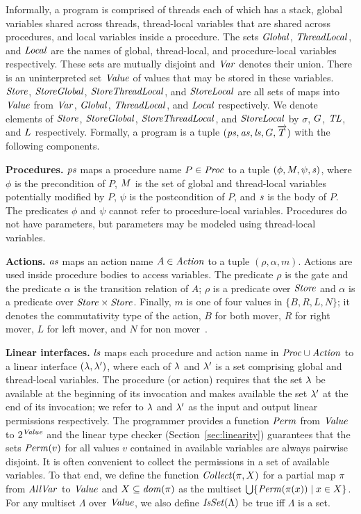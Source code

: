 Informally, a \civl program is comprised of threads each of which has a stack, global variables shared across threads, 
thread-local variables that are shared across procedures, and local variables inside a procedure.
The sets $\mathit{Global}$, $\mathit{ThreadLocal}$, and $\mathit{Local}$ are the names of global, thread-local, and procedure-local variables 
respectively.
These sets are mutually disjoint and $\mathit{Var}$ denotes their union.
There is an uninterpreted set $\mathit{Value}$ of values that may be stored in these variables.
$\mathit{Store}$, $\mathit{StoreGlobal}$, $\mathit{StoreThreadLocal}$, and $\mathit{StoreLocal}$ are all sets of maps into $\mathit{Value}$
from $\mathit{Var}$, $\mathit{Global}$, $\mathit{ThreadLocal}$, and $\mathit{Local}$ respectively.
We denote elements of $\mathit{Store}$, $\mathit{StoreGlobal}$, $\mathit{StoreThreadLocal}$, and $\mathit{StoreLocal}$
by $\sigma$, $G$, $\mathit{TL}$, and $L$ respectively.
Formally, a \civl program is a tuple $(\mathit{ps}, \mathit{as}, \mathit{ls}, G, \overrightarrow{T})$ with the following components.

\noindent
{\bf Procedures.}
$\mathit{ps}$ maps a procedure name $P \in \mathit{Proc}$ to a tuple $(\phi, M, \psi, \mathit{s})$, 
where $\phi$ is the precondition of $P$, $M$ is the set of global and thread-local variables potentially modified by $P$, 
$\psi$ is the postcondition of $P$, and $\mathit{s}$ is the body of $P$.
The predicates $\phi$ and $\psi$ cannot refer to procedure-local variables.
Procedures do not have parameters, but parameters may be modeled using thread-local variables.

\noindent
{\bf Actions.}
$\mathit{as}$ maps an action name $A \in \mathit{Action}$ to a tuple $(\rho,\alpha,m)$.
Actions are used inside procedure bodies to access variables.
The predicate $\rho$ is the gate and the predicate $\alpha$ is the transition relation of $A$;
$\rho$ is a predicate over $\mathit{Store}$ and $\alpha$ is a predicate over $\mathit{Store} \times \mathit{Store}$.
Finally, $m$ is one of four values in $\{B,R,L,N\}$;
it denotes the commutativity type of the action, $B$ for both mover, $R$ for right mover, $L$ for left mover, 
and $N$ for non mover~\cite{FlanaganFLQ08}. 

\noindent
{\bf Linear interfaces.}
$\mathit{ls}$ maps each procedure and action name in $\mathit{Proc} \cup \mathit{Action}$ to a linear interface 
$(\lambda,\lambda')$, where each of $\lambda$ and $\lambda'$ is a set comprising global and thread-local variables.
The procedure (or action) requires that the set $\lambda$ be available at the beginning of its invocation 
and makes available the set $\lambda'$ at the end of its invocation; 
we refer to $\lambda$ and $\lambda'$ as the input and output linear permissions respectively.
The programmer provides a function $\mathit{Perm}$ from $\mathit{Value}$ to $2^{\mathit{Value}}$
and the linear type checker (Section~\ref{sec:linearity}) guarantees that the sets $\mathit{Perm}(v)$ for all values $v$ contained 
in available variables are always pairwise disjoint.
It is often convenient to collect the permissions in a set of available variables.
To that end, we define the function $\mathit{Collect}(\pi,X)$ for a partial map $\pi$ 
from $\mathit{AllVar}$ to $\mathit{Value}$ and $X \subseteq \mathit{dom}(\pi)$ as the multiset $\bigcup \{\mathit{Perm}(\pi(x)) \mid x \in X\}$.
For any multiset $\Lambda$ over $\mathit{Value}$, we also define $\mathit{IsSet}(\Lambda)$ be true iff $\Lambda$ is a set.

